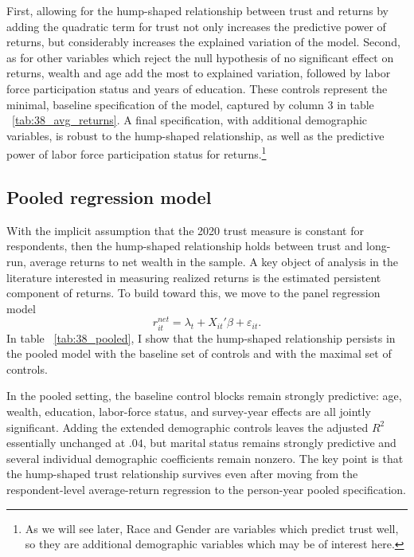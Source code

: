 \par First, allowing for the hump-shaped relationship between trust and returns by adding the quadratic term for trust not only increases the predictive power of returns, but considerably increases the explained variation of the model. Second, as for other variables which reject the null hypothesis of no significant effect on returns, wealth and age add the most to explained variation, followed by labor force participation status and years of education. These controls represent the minimal, baseline specification of the model, captured by column 3 in table ~\ref{tab:38_avg_returns}. A final specification, with additional demographic variables, is robust to the hump-shaped relationship, as well as the predictive power of labor force participation status for returns.\footnote{As we will see later, Race and Gender are variables which predict trust well, so they are additional demographic variables which may be of interest here.}

\subsection{Pooled regression model}

\par With the implicit assumption that the 2020 trust measure is constant for respondents, then the hump-shaped relationship holds between trust and long-run, average returns to net wealth in the sample. A key object of analysis in the literature interested in measuring realized returns is the estimated persistent component of returns. To build toward this, we move to the panel regression model \[r^{net}_{it} = \lambda_t + X_{it}'\beta + \varepsilon_{it}.\] In table ~\ref{tab:38_pooled}, I  show that the hump-shaped relationship persists in the pooled model with the baseline set of controls and with the maximal set of controls.

\FloatBarrier

\par In the pooled setting, the baseline control blocks remain strongly predictive: age, wealth, education, labor-force status, and survey-year effects are all jointly significant. Adding the extended demographic controls leaves the adjusted $R^2$ essentially unchanged at $.04$, but marital status remains strongly predictive and several individual demographic coefficients remain nonzero. The key point is that the hump-shaped trust relationship survives even after moving from the respondent-level average-return regression to the person-year pooled specification.


